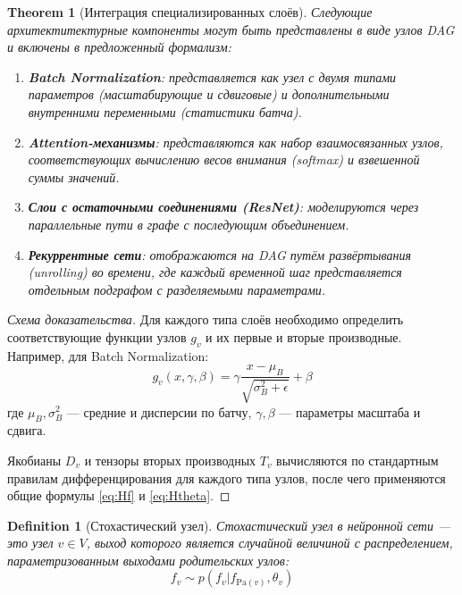 \documentclass[11pt]{article}
\newtheorem{theorem}{Theorem}
\newtheorem{definition}{Definition}
\newcommand{\Pa}{\mathrm{Pa}} %
\begin{document}
\begin{theorem}[Интеграция специализированных слоёв]
  Следующие архитектитектурные компоненты могут быть представлены в виде узлов DAG и включены в предложенный формализм:
  \begin{enumerate}
    \item \textbf{Batch Normalization}: представляется как узел с двумя типами параметров (масштабирующие и
      сдвиговые) и дополнительными внутренними переменными (статистики батча).
    \item \textbf{Attention-механизмы}: представляются как набор взаимосвязанных узлов, соответствующих
      вычислению весов внимания (softmax) и взвешенной суммы значений.
    \item \textbf{Слои с остаточными соединениями (ResNet)}: моделируются через параллельные пути в графе с
      последующим объединением.
    \item \textbf{Рекуррентные сети}: отображаются на DAG путём развёртывания (unrolling) во времени, где
      каждый временной шаг представляется отдельным подграфом с разделяемыми параметрами.
  \end{enumerate}
\end{theorem}

\begin{proof}[Схема доказательства]
  Для каждого типа слоёв необходимо определить соответствующие функции узлов $g_v$ и их первые и вторые
  производные. Например, для Batch Normalization:
  \[
    g_v(x, \gamma, \beta) = \gamma \frac{x - \mu_B}{\sqrt{\sigma_B^2 + \epsilon}} + \beta
  \]
  где $\mu_B, \sigma_B^2$ — средние и дисперсии по батчу, $\gamma, \beta$ — параметры масштаба и сдвига.

  Якобианы $D_v$ и тензоры вторых производных $T_v$ вычисляются по стандартным правилам дифференцирования для
  каждого типа узлов, после чего применяются общие формулы \eqref{eq:Hf} и \eqref{eq:Htheta}.
\end{proof}

\begin{definition}[Стохастический узел]
  Стохастический узел в нейронной сети — это узел $v \in V$, выход которого является случайной величиной с
  распределением, параметризованным выходами родительских узлов:
  \[
    f_v \sim p(f_v | f_{\Pa(v)}, \theta_v)
  \]
\end{definition}
\end{document}
